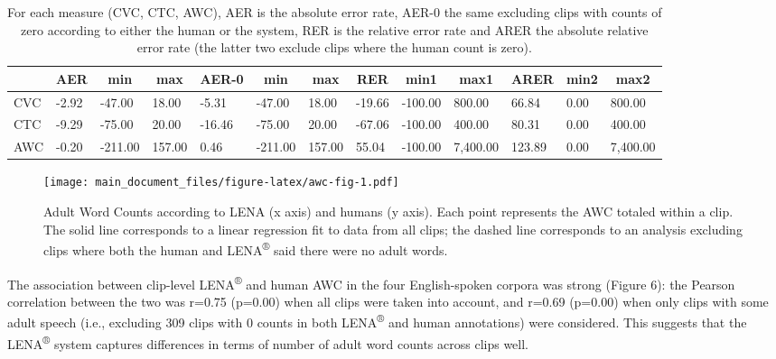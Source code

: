 \documentclass[english,table,man,floatsintext]{apa6}
\begin{document}
\begin{table}[tbp]

\begin{center}
\begin{threeparttable}

\caption{\label{tab:tabrers}For each measure (CVC, CTC, AWC), AER is the absolute error rate, AER-0 the same excluding clips with counts of zero according to either the human or the system, RER is the relative error rate and ARER the absolute relative error rate (the latter two exclude clips where the human count is zero). }

\begin{tabular}{lllllllllllll}
\toprule
 & \multicolumn{1}{c}{AER} & \multicolumn{1}{c}{min} & \multicolumn{1}{c}{max} & \multicolumn{1}{c}{AER-0} & \multicolumn{1}{c}{min} & \multicolumn{1}{c}{max} & \multicolumn{1}{c}{RER} & \multicolumn{1}{c}{min1} & \multicolumn{1}{c}{max1} & \multicolumn{1}{c}{ARER} & \multicolumn{1}{c}{min2} & \multicolumn{1}{c}{max2}\\
\midrule
CVC & -2.92 & -47.00 & 18.00 & -5.31 & -47.00 & 18.00 & -19.66 & -100.00 & 800.00 & 66.84 & 0.00 & 800.00\\
CTC & -9.29 & -75.00 & 20.00 & -16.46 & -75.00 & 20.00 & -67.06 & -100.00 & 400.00 & 80.31 & 0.00 & 400.00\\
AWC & -0.20 & -211.00 & 157.00 & 0.46 & -211.00 & 157.00 & 55.04 & -100.00 & 7,400.00 & 123.89 & 0.00 & 7,400.00\\
\bottomrule
\end{tabular}

\end{threeparttable}
\end{center}

\end{table}

\begin{figure}
\centering
\texttt{[image: main\_document\_files/figure-latex/awc-fig-1.pdf]}
\caption{\label{fig:awc-fig}Adult Word Counts according to LENA (x axis) and
humans (y axis). Each point represents the AWC totaled within a clip.
The solid line corresponds to a linear regression fit to data from all
clips; the dashed line corresponds to an analysis excluding clips where
both the human and LENA\textsuperscript{®} said there were no adult
words.}
\end{figure}

The association between clip-level LENA\textsuperscript{®} and human AWC
in the four English-spoken corpora was strong (Figure 6): the Pearson
correlation between the two was r=0.75 (p=0.00) when all clips were
taken into account, and r=0.69 (p=0.00) when only clips with some adult
speech (i.e., excluding 309 clips with 0 counts in both
LENA\textsuperscript{®} and human annotations) were considered. This
suggests that the LENA\textsuperscript{®} system captures differences in
terms of number of adult word counts across clips well.
\end{document}
